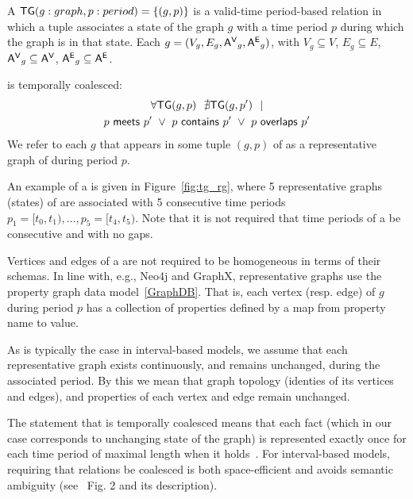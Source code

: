 \begin{definition}[TGraph]
A \tg $\textsf{TG}(g:graph, p:period) = \{ (g,p) \}$ is a valid-time
period-based relation in which a tuple associates a state of the graph
$g$ with a time period $p$ during which the graph is in that state.
%
Each $g = (V_g, E_g, \mathsf{A^{V}}_g, \mathsf{A^{E}}_g)$, with $V_g \subseteq V$, $E_g
\subseteq E$, $\mathsf{A^{V}}_g \subseteq \mathsf{A^{V}}$, $\mathsf{A^{E}}_g \subseteq \mathsf{A^{E}}$.

\tgg is temporally coalesced:
\begin{multline}
\forall \textsf{TG}(g,p)~~\nexists \textsf{TG}(g,p')~~| \\
        p~\mathsf{meets}~p'~\lor~p~\mathsf{contains}~p'~\lor~p~\mathsf{overlaps}~p'
\end{multline}
We refer to each $g$ that appears in some tuple $(g,p)$ of \tgg as a
representative graph of \tgg during period $p$.
\label{def:tg_abstract}
\end{definition}

An example of a \tg is given in Figure~\ref{fig:tg_rg}, where 5
representative graphs (states) of  are associated with 5
consecutive time periods $p_1=[t_0,t_1), \ldots, p_5=[t_4,t_5)$.  Note
    that it is not required that time periods of a \tg be consecutive
    and with no gaps.

    Vertices and edges of a \tg are not required to be homogeneous in
    terms of their schemas.  In line with, e.g., Neo4j and GraphX,
    representative graphs use the property graph data
    model~\ref{GraphDB}.  That is, each vertex (resp. edge) of $g$
    during period $p$ has a collection of properties defined by a map
    from property name to value.

As is typically the case in interval-based models, we assume that each
representative graph exists continuously, and remains unchanged,
during the associated period.  By this we mean that graph topology
(identies of its vertices and edges), and properties of each vertex
and edge remain unchanged.  

The statement that \tgg is temporally coalesced means that each fact
(which in our case corresponds to unchanging state of the graph) is
represented exactly once for each time period of maximal length when
it holds~\cite{DBLP:conf/vldb/BohlenSS96}.  For interval-based models,
requiring that relations be coalesced is both space-efficient and
avoids semantic ambiguity (see~\cite{DBLP:reference/db/JensenS09k}
Fig. 2 and its description).

